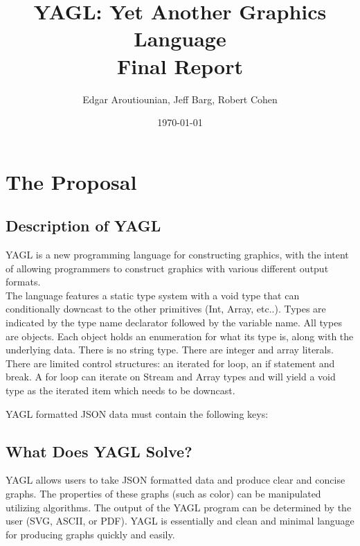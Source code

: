 \documentclass[12pt]{article}
\begin{document}
\title{YAGL: Yet Another Graphics Language\\Final Report}
\author{Edgar Aroutiounian, Jeff Barg, Robert Cohen}
\date{\today}
\maketitle


\section{The Proposal}
\subsection{Description of YAGL}
YAGL is a new programming language for constructing graphics, with the intent of allowing programmers to construct graphics with various different output formats.\\

The language features a static type system with a void type that can conditionally downcast to the other primitives (Int, Array, etc..).  Types are indicated by the type name declarator followed by the variable name.  All types are objects.  Each object holds an enumeration for what its type is, along with the underlying data.  There is no string type.  There are integer and array literals.\\

There are limited control structures: an iterated for loop, an if statement and break.  A for loop can iterate on Stream and Array types and will yield a void type as the iterated item which needs to be downcast.

YAGL formatted JSON data must contain the following keys:\\


\subsection{What Does YAGL Solve?}
YAGL allows users to take JSON formatted data and produce clear and concise graphs. The properties of these graphs (such as color) can be manipulated utilizing algorithms. The output of the YAGL program can be determined by the user (SVG, ASCII, or PDF). YAGL is essentially and clean and minimal language for producing graphs quickly and easily.
\end{document}
